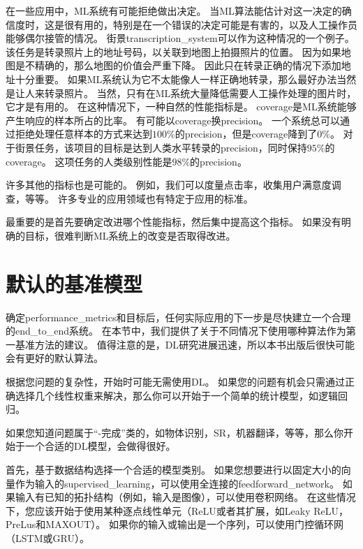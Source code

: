
在一些应用中，\gls{ML}系统有可能拒绝做出决定。
当\gls{ML}算法能估计对这一决定的确信度时，这是很有用的，特别是在一个错误的决定可能是有害的，以及人工操作员能够偶尔接管的情况。
街景\gls{transcription_system}可以作为这种情况的一个例子。
该任务是转录照片上的地址号码，以关联到地图上拍摄照片的位置。
因为如果地图是不精确的，那么地图的价值会严重下降。
因此只在转录正确的情况下添加地址十分重要。
如果\gls{ML}系统认为它不太能像人一样正确地转录，那么最好办法当然是让人来转录照片。
当然，只有在\gls{ML}系统大量降低需要人工操作处理的图片时，它才是有用的。
在这种情况下，一种自然的性能指标是。
\gls{coverage}是\gls{ML}系统能够产生响应的样本所占的比率。
有可能以\gls{coverage}换\gls{precision}。
一个系统总可以通过拒绝处理任意样本的方式来达到$100\%$的\gls{precision}，但是\gls{coverage}降到了$0\%$。
对于街景任务，该项目的目标是达到人类水平转录的\gls{precision}，同时保持$95\%$的\gls{coverage}。
这项任务的人类级别性能是$98\%$的\gls{precision}。

许多其他的指标也是可能的。
例如，我们可以度量点击率，收集用户满意度调查，等等。
许多专业的应用领域也有特定于应用的标准。

最重要的是首先要确定改进哪个性能指标，然后集中提高这个指标。
如果没有明确的目标，很难判断\gls{ML}系统上的改变是否取得改进。


\section{默认的基准模型}
\label{sec:default_baseline_models}
确定\gls{performance_metrics}和目标后，任何实际应用的下一步是尽快建立一个合理的\gls{end_to_end}系统。
在本节中，我们提供了关于不同情况下使用哪种算法作为第一基准方法的建议。
值得注意的是，\gls{DL}研究进展迅速，所以本书出版后很快可能会有更好的默认算法。

根据您问题的复杂性，开始时可能无需使用\gls{DL}。
如果您的问题有机会只需通过正确选择几个线性权重来解决，那么你可以开始于一个简单的统计模型，如逻辑回归。

如果您知道问题属于“-完成”类的，如物体识别，\gls{SR}，机器翻译，等等，那么你开始于一个合适的\gls{DL}模型，会做得很好。

首先，基于数据结构选择一个合适的模型类别。
如果您想要进行以固定大小的向量作为输入的\gls{supervised_learning}，可以使用全连接的\gls{feedforward_network}。
如果输入有已知的拓扑结构（例如，输入是图像），可以使用卷积网络。
在这些情况下，您应该开始于使用某种逐点线性单元（ReLU或者其扩展，如Leaky ReLU，PreLus和MAXOUT）。
如果你的输入或输出是一个序列，可以使用门控循环网（LSTM或GRU）。

